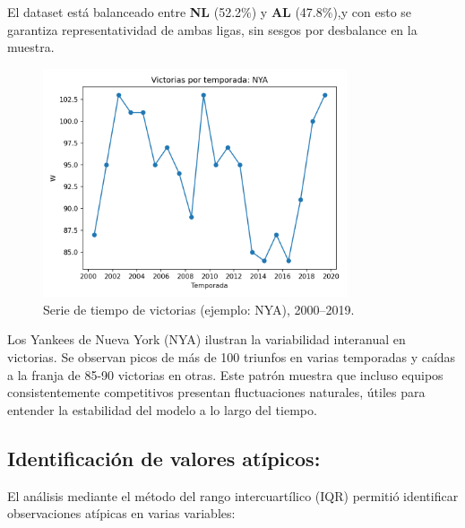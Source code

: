 \documentclass[10pt]{article}
\begin{document}
El dataset está balanceado entre \textbf{NL} (52.2\%) y \textbf{AL} (47.8\%),y con esto se garantiza representatividad de ambas ligas, sin sesgos por desbalance en la muestra.

\begin{figure}[H]
    \centering
    \includegraphics[width=0.8\textwidth]{../plots/ts_W_NYA.png}
    \caption{Serie de tiempo de victorias (ejemplo: NYA), 2000--2019.}
\end{figure}

Los Yankees de Nueva York (NYA) ilustran la variabilidad interanual en victorias. 
Se observan picos de más de 100 triunfos en varias temporadas y caídas a la franja de 85-90 victorias en otras. 
Este patrón muestra que incluso equipos consistentemente competitivos presentan fluctuaciones naturales, útiles para entender la estabilidad del modelo a lo largo del tiempo.

\subsection{Identificación de valores atípicos:}

El análisis mediante el método del rango intercuartílico (IQR) permitió identificar observaciones atípicas en varias variables:
\end{document}
